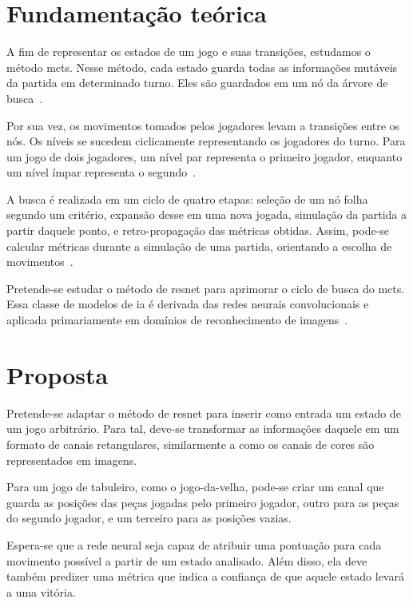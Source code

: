 \documentclass[12pt]{article}
\begin{document}
\section{Fundamentação teórica}%
\label{sec:fundamentacao_teorica}

A fim de representar os estados de um jogo e suas transições, estudamos o método \gls{mcts}.
Nesse método, cada estado guarda todas as informações mutáveis da partida em determinado turno.
Eles são guardados em um nó da árvore de busca~\cite{kocsis2006bandit, coulom2006efficient}.

Por sua vez, os movimentos tomados pelos jogadores levam a transições entre os nós.
Os níveis se sucedem ciclicamente representando os jogadores do turno.
Para um jogo de dois jogadores, um nível par representa o primeiro jogador, enquanto um nível ímpar representa o segundo~\cite{mcts-swiechowski}.

A busca é realizada em um ciclo de quatro etapas: seleção de um nó folha segundo um critério, expansão desse em uma nova jogada, simulação da partida a partir daquele ponto, e retro-propagação das métricas obtidas.
Assim, pode-se calcular métricas durante a simulação de uma partida, orientando a escolha de movimentos~\cite{mcts-swiechowski}.

Pretende-se estudar o método de \gls{resnet} para aprimorar o ciclo de busca do \gls{mcts}.
Essa classe de modelos de \gls{ia} é derivada das redes neurais convolucionais e aplicada primariamente em domínios de reconhecimento de imagens~\cite{he2015deep,zewen2022convolutional}.

\section{Proposta}%
\label{sec:proposta}

Pretende-se adaptar o método de \gls{resnet} para inserir como entrada um estado de um jogo arbitrário.
Para tal, deve-se transformar as informações daquele em um formato de canais retangulares, similarmente a como os canais de cores são representados em imagens.

Para um jogo de tabuleiro, como o jogo-da-velha, pode-se criar um canal que guarda as posições das peças jogadas pelo primeiro jogador, outro para as peças do segundo jogador, e um terceiro para as posições vazias.

Espera-se que a rede neural seja capaz de atribuir uma pontuação para cada movimento possível a partir de um estado analisado.
Além disso, ela deve também predizer uma métrica que indica a confiança de que aquele estado levará a uma vitória.
\end{document}
